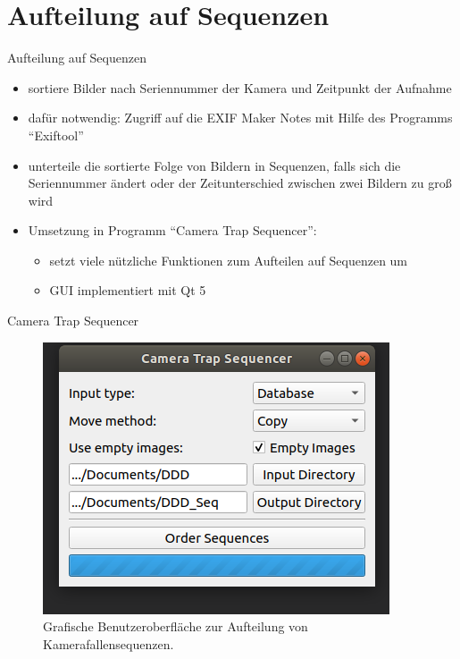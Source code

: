 \section{Aufteilung auf Sequenzen}

\begin{frame}[t,fragile]{Aufteilung auf Sequenzen}
	\begin{itemize}
		\item sortiere Bilder nach Seriennummer der Kamera und Zeitpunkt der Aufnahme
		\item dafür notwendig: Zugriff auf die EXIF Maker Notes mit Hilfe des Programms \enquote{Exiftool} \cite{exif}
		\item unterteile die sortierte Folge von Bildern in Sequenzen, falls sich die Seriennummer ändert oder der Zeitunterschied zwischen zwei Bildern zu groß wird
		\item Umsetzung in Programm \enquote{Camera Trap Sequencer}:
			\begin{itemize}
				\item setzt viele nützliche Funktionen zum Aufteilen auf Sequenzen um
				\item GUI implementiert mit Qt 5
			\end{itemize}
	\end{itemize}
\end{frame}

\begin{frame}[t, fragile]{Camera Trap Sequencer}
	\begin{figure}
	\centering
	\includegraphics[scale=0.5]{img/CameraTrapSequencer.png}
	\caption{Grafische Benutzeroberfläche zur Aufteilung von Kamerafallensequenzen.}
	\end{figure}
\end{frame}